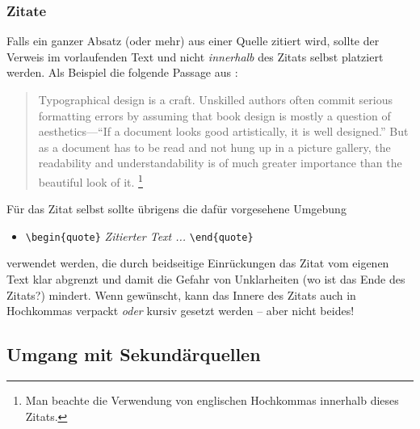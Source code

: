 \subsubsection{Zitate}
Falls ein ganzer Absatz (oder mehr) aus einer Quelle zitiert wird,
sollte der Verweis im vorlaufenden Text und nicht
\emph{innerhalb} des Zitats selbst platziert werden. Als Beispiel die folgende Passage
aus \cite{Oetiker2015}:
\begin{quote}
Typographical design is a craft. Unskilled authors often commit
serious formatting errors by assuming that book design is mostly a
question of aesthetics---``If a document looks good artistically,
it is well designed.'' But as a document has to be read and not
hung up in a picture gallery, the readability and
understandability is of much greater importance than the beautiful
look of it.%
\footnote{Man beachte die Verwendung von englischen Hochkommas innerhalb dieses
Zitats.}
\end{quote}
Für das Zitat selbst sollte übrigens die dafür vorgesehene Umgebung
%
\begin{itemize}
 \item[] \verb!\begin{quote}! \emph{Zitierter Text ...} \verb!\end{quote}!
\end{itemize}
%
verwendet werden, die durch beidseitige Einrückungen das
Zitat vom eigenen Text klar abgrenzt und damit die Gefahr von
Unklarheiten (wo ist das Ende des Zitats?) mindert.
Wenn gewünscht, kann das Innere des Zitats auch in Hochkommas verpackt 
\emph{oder} kursiv gesetzt werden -- aber nicht beides!



\subsection{Umgang mit Sekundärquellen}

